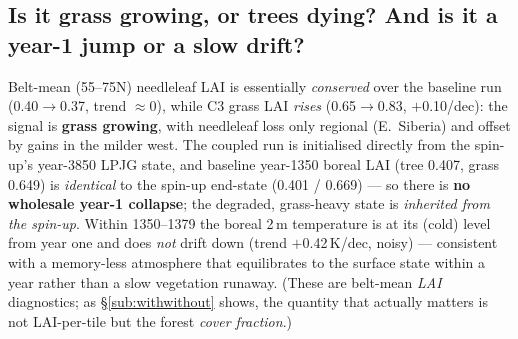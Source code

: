 \documentclass[10pt]{article}
\begin{document}
\subsection{Is it grass growing, or trees dying? And is it a year-1 jump or a slow drift?}
Belt-mean (55--75\textdegree N) needleleaf LAI is essentially \emph{conserved} over the baseline run (0.40$\to$0.37,
trend $\approx$0), while C3 grass LAI \emph{rises} (0.65$\to$0.83, $+$0.10/dec): the signal is \textbf{grass
growing}, with needleleaf loss only regional (E.\ Siberia) and offset by gains in the milder west. The coupled
run is initialised directly from the spin-up's year-3850 LPJG state, and baseline year-1350 boreal LAI
(tree 0.407, grass 0.649) is \emph{identical} to the spin-up end-state (0.401 / 0.669) --- so there is
\textbf{no wholesale year-1 collapse}; the degraded, grass-heavy state is \emph{inherited from the spin-up}.
Within 1350--1379 the boreal 2\,m temperature is at its (cold) level from year one and does \emph{not} drift
down (trend $+$0.42\,K/dec, noisy) --- consistent with a memory-less atmosphere that equilibrates to the surface
state within a year rather than a slow vegetation runaway. (These are belt-mean \emph{LAI} diagnostics; as
\S\ref{sub:withwithout} shows, the quantity that actually matters is not LAI-per-tile but the forest \emph{cover fraction}.)
\end{document}
